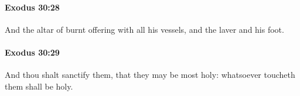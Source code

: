 		\paragraph{Exodus 30:28} %
			\label{EXODUS-30-28}

			And the altar of burnt offering with all his vessels, and the laver and his foot.


		\paragraph{Exodus 30:29} %
			\label{EXODUS-30-29}

			And thou shalt sanctify them, that they may be most holy: whatsoever toucheth them shall be holy.


